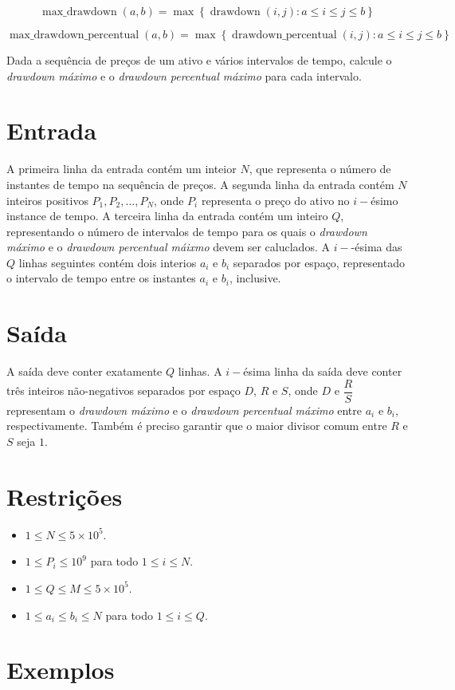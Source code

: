 \begin{equation*}
    \operatorname{max\_drawdown}\left(a, b\right) = \max\left\{\operatorname{drawdown}\left(i, j\right) : {a \leq i \leq j \leq b}\right\}
\end{equation*}

\begin{equation*}
    \operatorname{max\_drawdown\_percentual}\left(a, b\right) = \max\left\{\operatorname{drawdown\_percentual}\left(i, j\right) : {a \leq i \leq j \leq b}\right\}
\end{equation*}

Dada a sequência de preços de um ativo e vários intervalos de tempo, calcule o \emph{drawdown máximo} e o \emph{drawdown percentual máximo}
para cada intervalo.

\section*{Entrada}

A primeira linha da entrada contém um inteior $N$, que representa o número de instantes de tempo na sequência de preços.
A segunda linha da entrada contém $N$ inteiros positivos $P_1, P_2, \ldots, P_N$, onde $P_i$ representa o preço do ativo no $i-$ésimo instance
de tempo.
A terceira linha da entrada contém um inteiro $Q$, representando o número de intervalos de tempo para os quais o \emph{drawdown máximo} e o
\emph{drawdown percentual máixmo}  devem ser caluclados.
A $i-$-ésima das $Q$ linhas seguintes contém dois interios $a_i$ e $b_i$ separados por espaço, representado o intervalo de tempo entre os instantes $a_i$ e $b_i$, inclusive. 
\section*{Saída}

A saída deve conter exatamente $Q$ linhas. A $i-$ésima linha da saída deve conter três inteiros não-negativos separados por espaço $D$, $R$ e $S$, onde $D$ e $\dfrac{R}{S}$ representam o \emph{drawdown máximo} e o \emph{drawdown percentual máximo} entre $a_i$ e $b_i$, respectivamente. Também é preciso garantir que o maior divisor comum entre $R$ e $S$ seja $1$. 

\section*{Restrições}

\begin{itemize}
    \item $1 \leq N \leq 5\times{10}^5$.
    \item $1 \leq P_i \leq {10}^9$ para todo $1 \leq i \leq N$.
    \item $1 \leq Q \leq M \leq 5\times{10}^5$.
    \item $1 \leq a_i \leq b_i \leq N$ para todo $1 \leq i \leq Q$.
\end{itemize}


\section*{Exemplos}

\exemplo
